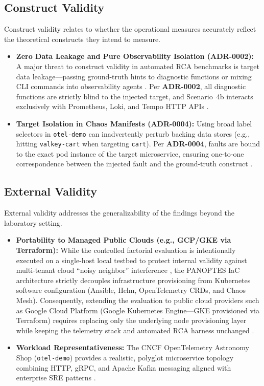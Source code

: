 \subsection{Construct Validity}
Construct validity relates to whether the operational measures accurately reflect the theoretical constructs they intend to measure.
\begin{itemize}
    \item \textbf{Zero Data Leakage and Pure Observability Isolation (ADR-0002):} A major threat to construct validity in automated RCA benchmarks is target data leakage---passing ground-truth hints to diagnostic functions or mixing CLI commands into observability agents \cite{kaufman_2012, verdecchia_2023}. Per \textbf{ADR-0002}, all diagnostic functions are strictly blind to the injected target, and Scenario~4b interacts exclusively with Prometheus, Loki, and Tempo HTTP APIs \cite{sigelman_2010, wang_2024, barata_2026}.
    \item \textbf{Target Isolation in Chaos Manifests (ADR-0004):} Using broad label selectors in \texttt{otel-demo} can inadvertently perturb backing data stores (e.g., hitting \texttt{valkey-cart} when targeting \texttt{cart}). Per \textbf{ADR-0004}, faults are bound to the exact pod instance of the target microservice, ensuring one-to-one correspondence between the injected fault and the ground-truth construct \cite{babbie_2020, basiri_2016}.
\end{itemize}

\subsection{External Validity}
External validity addresses the generalizability of the findings beyond the laboratory setting.
\begin{itemize}
    \item \textbf{Portability to Managed Public Clouds (e.g., GCP/GKE via Terraform):} While the controlled factorial evaluation is intentionally executed on a single-host local testbed to protect internal validity against multi-tenant cloud ``noisy neighbor'' interference \cite{kuria_2024}, the PANOPTES IaC architecture strictly decouples infrastructure provisioning from Kubernetes software configuration (Ansible, Helm, OpenTelemetry CRDs, and Chaos Mesh). Consequently, extending the evaluation to public cloud providers such as Google Cloud Platform (Google Kubernetes Engine---GKE provisioned via Terraform) requires replacing only the underlying node provisioning layer while keeping the telemetry stack and automated RCA harness unchanged \cite{bass_2012}.
    \item \textbf{Workload Representativeness:} The CNCF OpenTelemetry Astronomy Shop (\texttt{otel-demo}) provides a realistic, polyglot microservice topology combining HTTP, gRPC, and Apache Kafka messaging aligned with enterprise SRE patterns \cite{beyer_2016}.
\end{itemize}
